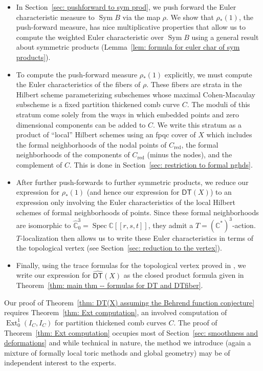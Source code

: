 \documentclass[12pt]{amsart}
\theoremstyle{definition}
\newcommand{\CC} {\mathbb{C}}          %
\newcommand{\Ext}{\operatorname{Ext}}
\newcommand{\Sym}{\operatorname{Sym}}
\newcommand{\DT}{\mathsf{DT}}
\newcommand{\Spec}{\operatorname{Spec}}
\renewcommand{\hat}{\widehat}
\newcommand{\DThat}{\widehat{\DT}}
\newcommand{\red}{\mathrm{red}}
\begin{document}
\begin{itemize}
\item In Section~\ref{sec: pushforward to sym prod}, we push forward
the Euler characteristic measure to $\Sym B$ via the map $\rho$. We
show that $\rho_{*}(1)$, the push-forward measure, has nice
multiplicative properties that allow us to compute the weighted
Euler characteristic over $\Sym B$ using a general result about
symmetric products (Lemma~\ref{lem: formula for euler char of sym
products}). 
\item To compute the push-forward measure $\rho_{*}(1)$ explicitly, we
must compute the Euler characteristics of the fibers of $\rho$. These
fibers are strata in the Hilbert scheme parameterizing subschemes
whose maximal Cohen-Macaulay subscheme is a fixed partition thickened
comb curve $C$. The moduli of this stratum come solely from the ways
in which embedded points and zero dimensional components can be added to
$C$. We write this stratum as a product of ``local'' Hilbert schemes
using an fpqc cover of $X$ which includes the formal neighborhoods of
the nodal points of $C_{\red}$, the formal neighborhoods of the
components of $C_{\red}$ (minus the nodes), and the complement of
$C$. This is done in Section~\ref{sec: restriction
to formal nghds}. 
\item After further push-forwards to further symmetric products, we
reduce our expression for $\rho_{*}(1)$ (and hence our expression for
$\DThat (X)$) to an expression only involving the Euler
characteristics of the local Hilbert schemes of formal neighborhoods
of points. Since these formal neighborhoods are isomorphic to
$\hat{\CC}^{3}_{0}=\Spec \CC [[r,s,t]]$, they admit a $T=\left(\CC^{*}
\right)^{3}$-action. $T$-localization then allows us to write these
Euler characteristics in terms of the topological vertex (see
Section~\ref{sec: reduction to the vertex}). 
\item Finally, using the trace formulas for the topological vertex
proved in \cite{Bryan-Kool-Young}, we write our expression for
$\DThat (X)$ as the closed product formula given in Theorem~\ref{thm:
main thm -- formulas for DT and DTfiber}. 
\end{itemize}

Our proof of Theorem~\ref{thm: DT(X) assuming the Behrend
function conjecture} requires Theorem~\ref{thm: Ext computation}, an
involved computation of $\Ext^{1}_{0}(I_{C},I_{C})$ for partition
thickened comb curves $C$. The proof of Theorem~\ref{thm: Ext
computation} occupies most of Section~\ref{sec: smoothness and
deformations} and while technical in nature, the method we introduce
(again a mixture of formally local toric methods and global geometry)
may be of independent interest to the experts.
\end{document}
